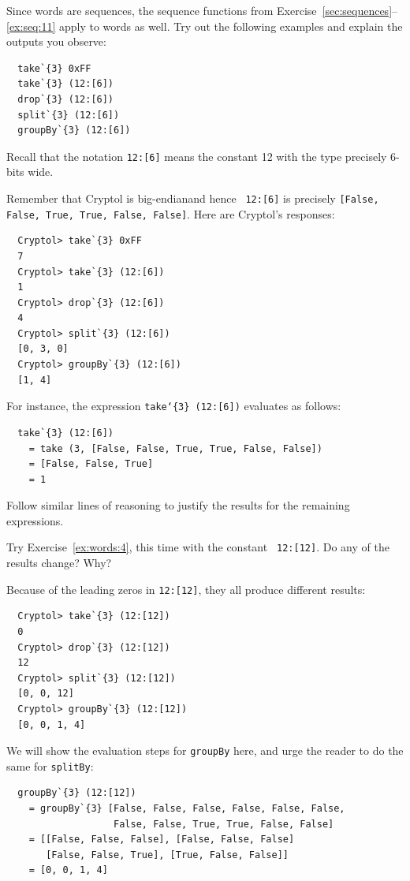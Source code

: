 \begin{Exercise}\label{ex:words:4}
Since words are sequences, the sequence functions from
Exercise~\ref{sec:sequences}--\ref{ex:seq:11} apply to words as well. Try out
the following examples and explain the outputs you
observe:\indTake\indDrop\indSplit\indGroup
\begin{Verbatim}
  take`{3} 0xFF
  take`{3} (12:[6])
  drop`{3} (12:[6])
  split`{3} (12:[6])
  groupBy`{3} (12:[6])
\end{Verbatim}
\end{Exercise}
\noindent Recall that the notation {\tt 12:[6]} means the constant 12
with the type precisely 6-bits wide.
\begin{Answer}
  Remember that Cryptol is big-endian\indEndianness and hence {\tt
    12:[6]} is precisely {\tt [False, False, True, True, False,
    False]}.  Here are Cryptol's responses:\indTake
\begin{Verbatim}
  Cryptol> take`{3} 0xFF
  7
  Cryptol> take`{3} (12:[6])
  1
  Cryptol> drop`{3} (12:[6])
  4
  Cryptol> split`{3} (12:[6])
  [0, 3, 0]
  Cryptol> groupBy`{3} (12:[6])
  [1, 4]
\end{Verbatim}
For instance, the expression {\tt take`\{3\} (12:[6])} evaluates as follows:
\begin{Verbatim}
  take`{3} (12:[6])
    = take (3, [False, False, True, True, False, False])
    = [False, False, True]
    = 1
\end{Verbatim}
Follow similar lines of reasoning to justify the results for the
remaining expressions.
\end{Answer}
\begin{Exercise}\label{ex:words:5}
  Try Exercise~\ref{ex:words:4}, this time with the constant {\tt
    12:[12]}. Do any of the results change? Why?
\end{Exercise}
\begin{Answer}
  Because of the leading zeros in {\tt 12:[12]}, they all produce
  different results:\indTake\indDrop\indSplit\indGroup
\begin{Verbatim}
  Cryptol> take`{3} (12:[12])
  0
  Cryptol> drop`{3} (12:[12])
  12
  Cryptol> split`{3} (12:[12])
  [0, 0, 12]
  Cryptol> groupBy`{3} (12:[12])
  [0, 0, 1, 4]
\end{Verbatim}
We will show the evaluation steps for {\tt groupBy} here, and urge the
reader to do the same for {\tt splitBy}:
\begin{Verbatim}
  groupBy`{3} (12:[12])
    = groupBy`{3} [False, False, False, False, False, False, 
                   False, False, True, True, False, False]
    = [[False, False, False], [False, False, False] 
       [False, False, True], [True, False, False]]
    = [0, 0, 1, 4]
\end{Verbatim}
\end{Answer}

